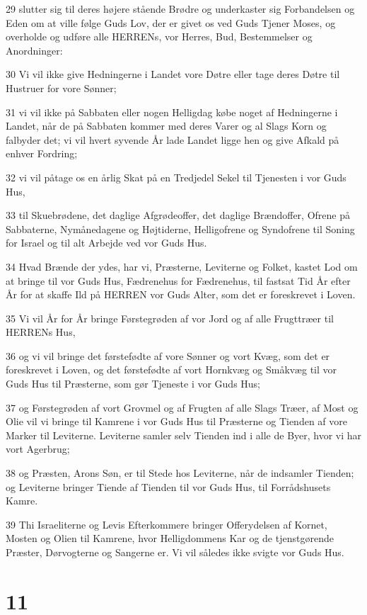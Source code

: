 \par 29 slutter sig til deres højere stående Brødre og underkaster sig Forbandelsen og Eden om at ville følge Guds Lov, der er givet os ved Guds Tjener Moses, og overholde og udføre alle HERRENs, vor Herres, Bud, Bestemmelser og Anordninger:
\par 30 Vi vil ikke give Hedningerne i Landet vore Døtre eller tage deres Døtre til Hustruer for vore Sønner;
\par 31 vi vil ikke på Sabbaten eller nogen Helligdag købe noget af Hedningerne i Landet, når de på Sabbaten kommer med deres Varer og al Slags Korn og falbyder det; vi vil hvert syvende År lade Landet ligge hen og give Afkald på enhver Fordring;
\par 32 vi vil påtage os en årlig Skat på en Tredjedel Sekel til Tjenesten i vor Guds Hus,
\par 33 til Skuebrødene, det daglige Afgrødeoffer, det daglige Brændoffer, Ofrene på Sabbaterne, Nymånedagene og Højtiderne, Helligofrene og Syndofrene til Soning for Israel og til alt Arbejde ved vor Guds Hus.
\par 34 Hvad Brænde der ydes, har vi, Præsterne, Leviterne og Folket, kastet Lod om at bringe til vor Guds Hus, Fædrenehus for Fædrenehus, til fastsat Tid År efter År for at skaffe Ild på HERREN vor Guds Alter, som det er foreskrevet i Loven.
\par 35 Vi vil År for År bringe Førstegrøden af vor Jord og af alle Frugttræer til HERRENs Hus,
\par 36 og vi vil bringe det førstefødte af vore Sønner og vort Kvæg, som det er foreskrevet i Loven, og det førstefødte af vort Hornkvæg og Småkvæg til vor Guds Hus til Præsterne, som gør Tjeneste i vor Guds Hus;
\par 37 og Førstegrøden af vort Grovmel og af Frugten af alle Slags Træer, af Most og Olie vil vi bringe til Kamrene i vor Guds Hus til Præsterne og Tienden af vore Marker til Leviterne. Leviterne samler selv Tienden ind i alle de Byer, hvor vi har vort Agerbrug;
\par 38 og Præsten, Arons Søn, er til Stede hos Leviterne, når de indsamler Tienden; og Leviterne bringer Tiende af Tienden til vor Guds Hus, til Forrådshusets Kamre.
\par 39 Thi Israeliterne og Levis Efterkommere bringer Offerydelsen af Kornet, Mosten og Olien til Kamrene, hvor Helligdommens Kar og de tjenstgørende Præster, Dørvogterne og Sangerne er. Vi vil således ikke svigte vor Guds Hus.

\chapter{11}


